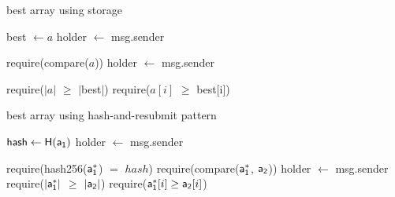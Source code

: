 \begin{algorithm}
    \caption{\label{alg:game-storage}\textsf{best array} using storage}
    \begin{algorithmic}[1]

        \State \textsf{best} $\gets a$
            \State \textsf{holder $\gets$ msg.sender}
        \EndFunction

            \State \textsf{require}(\textsf{compare}($a$))
            \State \textsf{holder} $\gets$ \textsf{msg.sender}
        \EndFunction

            \State \textsf{require}($|a|$ $\geq$ $|$\textsf{best}$|$)
            \State \textsf{require}($a[i]$ $\geq$ \textsf{best}[i])
            \EndFor
            \State {}
        \EndFunction
        \EndContract
        \vskip8pt
    \end{algorithmic}
\end{algorithm}

\begin{algorithm}
    \caption{\label{alg:game-memory}\textsf{best array} using hash-and-resubmit pattern}
    \begin{algorithmic}[1]

        \State $\textsf{hash} \gets \textsf{H}(\mathsf{a_1})$
            \State \textsf{holder} $\gets$ \textsf{msg.sender}
        \EndFunction

    \State \textsf{require}(\textsf{hash256}($\mathsf{a_1^*}$) $=$ $hash$)
        \State \textsf{require}(\textsf{compare}($\mathsf{a_1^*}$, $\mathsf{a_2}$))
        \State \textsf{holder} $\gets$ \textsf{msg.sender}
    \EndFunction
        \State \textsf{require}($|\mathsf{a_1^*}|$ $\geq$ $|\mathsf{a_2}|$)
            \State \textsf{require}($\mathsf{a_1^*}[i] \geq \mathsf{a_2}[i]$)
        \EndFor
    \EndFunction
    \State {}
    \EndContract
    \vskip8pt
    \end{algorithmic}
\end{algorithm}
